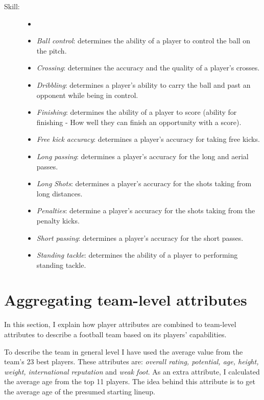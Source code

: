 \begin{description}
\begin{itemize}
    \end{itemize}
    \item[Skill:]
    \begin{itemize}
        \itemsep0.3em
        \item[]
        \item{\textit{Ball control}:} determines the ability of a player to control the ball on the pitch.
        \item{\textit{Crossing}:} determines the accuracy and the quality of a player's crosses.
        \item{\textit{Dribbling}:} determines a player's ability to carry the ball and past an opponent while being in control.
        \item{\textit{Finishing}:} determines the ability of a player to score (ability for finishing - How well they can finish an opportunity with a score).
        \item{\textit{Free kick accuracy}:} determines a player's accuracy for taking free kicks.
        \item{\textit{Long passing}:} determines a player's accuracy for the long and aerial passes.
        \item{\textit{Long Shots}:} determines a player's accuracy for the shots taking from long distances.
        \item{\textit{Penalties}:} determine a player's accuracy for the shots taking from the penalty kicks.
        \item{\textit{Short passing}:} determines a player's accuracy for the short passes.
        \item{\textit{Standing tackle}:} determines the ability of a player to performing standing tackle.

    \end{itemize}

\end{description}

\section{Aggregating team-level attributes}
In this section, I explain how player attributes are combined to team-level attributes to describe a football team based on its players' capabilities.

To describe the team in general level I have used the average value from the team's 23 best players. These attributes are: \textit{overall rating, potential, age, height, weight, international reputation} and \textit{weak foot}. As an extra attribute, I calculated the average age from the top 11 players. The idea behind this attribute is to get the average age of the presumed starting lineup.

